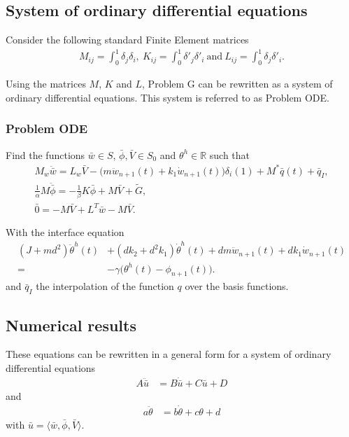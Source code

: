 \documentclass[../../main.tex]{subfiles}
\begin{document}
\subsection{System of ordinary differential equations}
Consider the following standard Finite Element matrices
\begin{align*}\label{ch6_eq10}
M_{ij} = \int_0^1 \delta_j \delta_i, ~K_{ij} = \int_0^1 \delta'_j\delta'_i ~\textrm{and} ~L_{ij} = \int_0^1 \delta_j\delta'_i.
\end{align*}

Using the matrices $M$, $K$ and $L$, Problem G can be rewritten as a system of ordinary differential equations. This system is referred to as Problem ODE.

\subsubsection{Problem ODE}
Find the functions $\bar{w} \in S$, $\bar{\phi}, \bar{V} \in S_0$ and $\theta^h \in \mathbb{R}$ such that
\begin{align}
M_w\ddot{\bar{w}} = L_w\bar{V} -\big(m \ddot{w}_{n+1}(t) + k_1 \dot{w}_{n+1}(t) \big)\delta_i(1) + M^* \bar{q}(t) + \bar{q}_I,\\
\label{sys2}
\frac{1}{\alpha} M \ddot{\bar{\phi}} = -\frac{1}{\beta} K\bar{\phi} + M\bar{V} + \tilde{G},\\
\label{sys2.1}
\bar{0} = -M\bar{V} + L^T\bar{w} - M\bar{V}.
\end{align}

With the interface equation
\begin{align} \label{sys3} \nonumber
(J+md^2) \ddot \theta^h(t) &+ (d k_2+ d^2 k_1 ) \dot \theta^h(t)  + dm {\ddot w}_{n+1}(t) +  dk_1 {\dot w}_{n+1}(t)\\
  =&  -\gamma \big(\theta^h(t) - {\phi}_{n+1}(t)\big).
\end{align} and $\bar{q}_I$ the interpolation of the function $q$ over the basis functions.


\subsection{Numerical results}
These equations can be rewritten in a general form for a system of ordinary differential equations
\begin{align}
	A\ddot{\bar{u}} &= B\dot{\bar{u}} + C\bar{u} + D
\end{align}
and
\begin{align}
	a \ddot{\theta} & = b \dot{\theta} + c \theta + d
\end{align} with $\bar{u} = \langle \bar{w}, \bar{\phi}, \bar{V} \rangle$.\\
\end{document}
